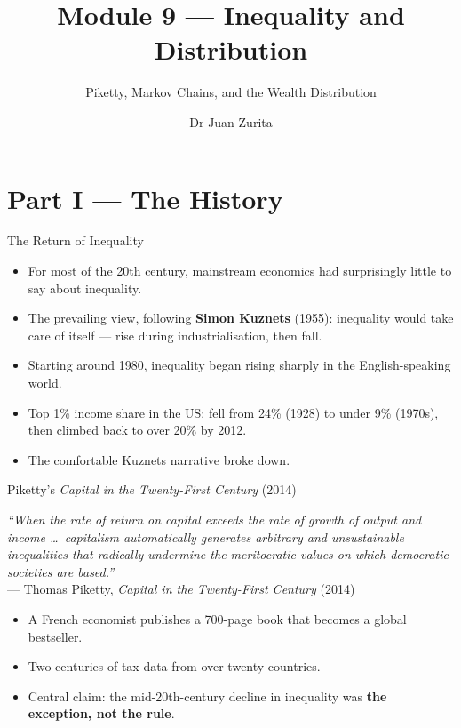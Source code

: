 \documentclass[aspectratio=169, 10pt]{beamer}
\title{Module 9 --- Inequality and Distribution}
\subtitle{Piketty, Markov Chains, and the Wealth Distribution}
\author{Dr Juan Zurita}
\institute{From Smith to Simulation\\
The University of Edinburgh~$\cdot$~School of Economics}
\date{}
\begin{document}
\maketitle

\section{Part I --- The History}

\begin{frame}{The Return of Inequality}
\begin{itemize}
  \item For most of the 20th century, mainstream economics had surprisingly
        little to say about inequality.
  \item The prevailing view, following \textbf{Simon Kuznets} (1955):
        inequality would take care of itself --- rise during industrialisation,
        then fall.
  \item Starting around 1980, inequality began rising sharply in the
        English-speaking world.
  \item Top 1\% income share in the US: fell from 24\% (1928) to under 9\%
        (1970s), then climbed back to over 20\% by 2012.
  \item The comfortable Kuznets narrative \alert{broke down}.
\end{itemize}
\end{frame}

\begin{frame}{Piketty's \textit{Capital in the Twenty-First Century} (2014)}
\begin{center}
\textit{``When the rate of return on capital exceeds the rate of growth
of output and income \ldots\ capitalism automatically generates arbitrary
and unsustainable inequalities that radically undermine the meritocratic
values on which democratic societies are based.''}\\[4pt]
--- Thomas Piketty, \textit{Capital in the Twenty-First Century} (2014)
\end{center}
\vspace{0.8em}
\begin{itemize}
  \item A French economist publishes a 700-page book that becomes a
        global bestseller.
  \item Two centuries of tax data from over twenty countries.
  \item Central claim: the mid-20th-century decline in inequality was
        \textbf{the exception, not the rule}.
\end{itemize}
\end{frame}
\end{document}
